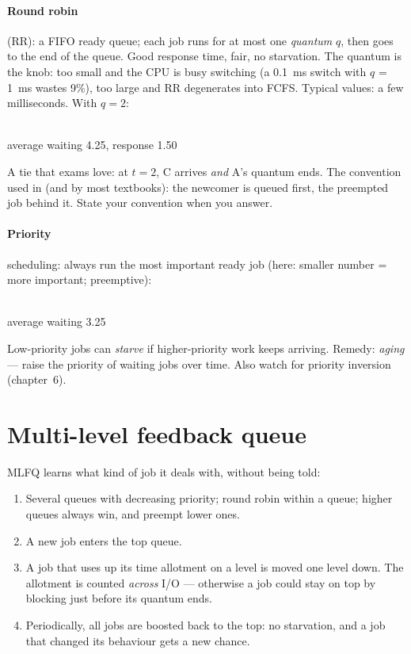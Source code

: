 \paragraph{Round robin} (RR): a FIFO ready queue; each job runs for at
most one \emph{quantum} $q$, then goes to the end of the queue. Good
response time, fair, no starvation. The quantum is the knob: too small and
the CPU is busy switching (a 0.1~ms switch with $q$ = 1~ms wastes 9\%),
too large and RR degenerates into FCFS. Typical values: a few
milliseconds. With $q = 2$:

\begin{center}\\ average waiting 4.25, response 1.50\end{center}

A tie that exams love: at $t = 2$, C arrives \emph{and} A's quantum
ends. The convention used in  (and by most textbooks): the
newcomer is queued first, the preempted job behind it. State your
convention when you answer.

\paragraph{Priority} scheduling: always run the most important ready job
(here: smaller number = more important; preemptive):

\begin{center}\\ average waiting 3.25\end{center}

Low-priority jobs can \emph{starve} if higher-priority work keeps
arriving. Remedy: \emph{aging} --- raise the priority of waiting jobs over
time. Also watch for priority inversion (chapter~6).

\section{Multi-level feedback queue}

MLFQ learns what kind of job it deals with, without being told:

\begin{enumerate}
  \item Several queues with decreasing priority; round robin within a
    queue; higher queues always win, and preempt lower ones.
  \item A new job enters the top queue.
  \item A job that uses up its time allotment on a level is moved one
    level down. The allotment is counted \emph{across} I/O --- otherwise a
    job could stay on top by blocking just before its quantum ends.
  \item Periodically, all jobs are boosted back to the top: no
    starvation, and a job that changed its behaviour gets a new chance.
\end{enumerate}

